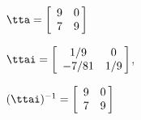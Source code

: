 {$\tta = \left[
\begin{array}{cc}
   9 & 0 \\
 7 & 9
\end{array}\hskip -3pt \right]$
}
{$\ttai = \left[
\begin{array}{cc}
1/9 & 0 \\
 -7/81 & 1/9
  \end{array} \hskip -3pt
\right]$,

$(\ttai)^{-1} = \left[
\begin{array}{cc}
 9 & 0 \\
 7 & 9
 \end{array}\hskip -3pt \right]$
}
